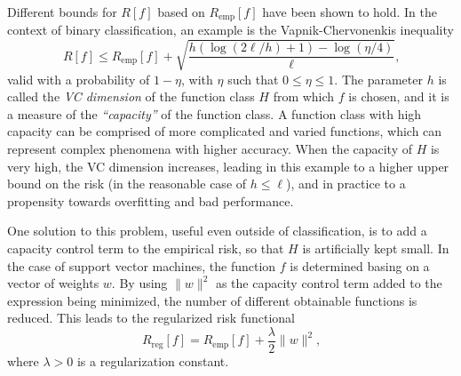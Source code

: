 \documentclass[12pt]{report}
\begin{document}
Different bounds for $ R[f] $ based on $ R_{\text{emp}}[f] $ have been shown to hold. In the context of binary classification, an example is the Vapnik-Chervonenkis inequality \cite{vapnik95}
\begin{equation} \label{vapnikbound}
R[f] \leq R_{\text{emp}}[f] + \sqrt{\dfrac{h(\log (2\ell /h) + 1) - \log (\eta /4)}{\ell}} \text{,}
\end{equation}
valid with a probability of $ 1 - \eta $, with $ \eta $ such that $ 0 \leq \eta \leq 1 $. The parameter $ h $ is called the \textit{VC dimension} of the function class $ H $ from which $ f $ is chosen, and it is a measure of the \textit{``capacity''} of the function class. A function class with high capacity can be comprised of more complicated and varied functions, which can represent complex phenomena with higher accuracy. When the capacity of $ H $ is very high, the VC dimension increases, leading in this example to a higher upper bound on the risk (in the reasonable case of $ h \leq \ell $), and in practice to a propensity towards overfitting and bad performance.

One solution to this problem, useful even outside of classification, is to add a capacity control term to the empirical risk, so that $ H $ is artificially kept small. In the case of support vector machines, the function $ f $ is determined basing on a vector of weights $ w $. By using $ \| w \|^2 $ as the capacity control term added to the expression being minimized, the number of different obtainable functions is reduced. This leads to the regularized risk functional \cite{tikhonov77}
\begin{equation} \label{regriskfun}
R_{\text{reg}}[f] = R_{\text{emp}}[f] + \dfrac{\lambda}{2}\| w \|^2 \text{,}
\end{equation}
where $ \lambda > 0 $ is a regularization constant.
\end{document}
